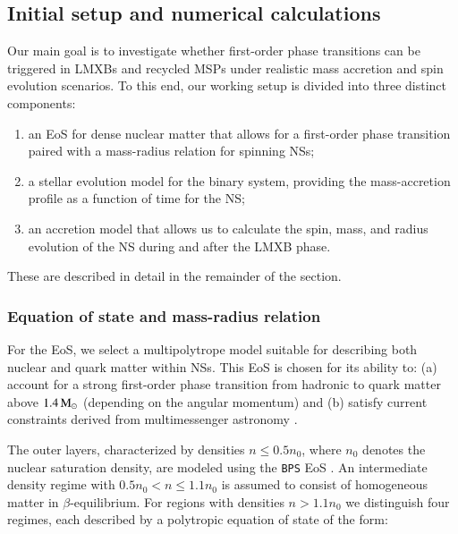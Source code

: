 \documentclass[main.tex]{subfiles}
\begin{document}
    \subsection{Initial setup and numerical calculations}\label{sec:ch4:setup}
    Our main goal is to investigate whether first-order phase transitions can be triggered in LMXBs and recycled MSPs under realistic mass accretion and spin evolution scenarios. To this end, our working setup is divided into three distinct components:
    
    \begin{enumerate}
        \item an EoS for dense nuclear matter that allows for a first-order phase transition paired with a mass-radius relation for spinning NSs; 
        \item a stellar evolution model for the binary system, providing the mass-accretion profile as a function of time for the NS; 
        \item an accretion model that allows us to calculate the spin, mass, and radius evolution of the NS during and after the LMXB phase.
    \end{enumerate}
    These are described in detail in the remainder of the section.
    
    
    
    \subsubsection{Equation of state and mass-radius relation}\label{sec:ch4:eos}
    For the EoS, we select a multipolytrope model suitable for describing both nuclear and quark matter within NSs. This EoS is chosen for its ability to: (a) account for a strong first-order phase transition from hadronic to quark matter above $1.4\mathrm{\,M_\odot}$ (depending on the angular momentum) and (b) satisfy current constraints derived from multimessenger astronomy \citep{antoniadis:2013sci, LIGOScientific:2018cki, Miller:2019cac, Riley:2019yda, 2020NatAs...4...72C}.
    
    The outer layers, characterized by densities $n \leq 0.5 n_0$, where $n_0$ denotes the nuclear saturation density, are modeled using the \texttt{BPS} EoS \citep{Baym:1971apj}. An intermediate density regime with $0.5 n_0 < n \leq 1.1 n_0$ is assumed to consist of homogeneous matter in $\beta$-equilibrium. For regions with densities $n > 1.1 n_0$ we distinguish four regimes, each described by a polytropic equation of state of the form:
    
\end{document}

